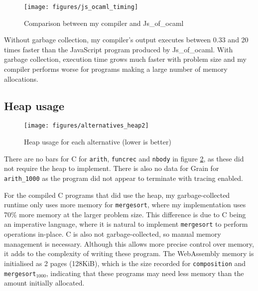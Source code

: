 \begin{figure}[H]
\hspace{-1.6cm}
\texttt{[image: figures/js\_ocaml\_timing]}
\vspace{-0.5cm}
\caption{Comparison between my compiler and Js\_of\_ocaml}
 \label{fig:js_oc_timing} 
\end{figure}

Without garbage collection, my compiler's output	executes between 0.33 and 20 times faster than the JavaScript program produced by  Js\_of\_ocaml. With garbage collection, execution time grows much faster with problem size and my compiler performs worse for programs making a large number of memory allocations.



\subsection{Heap usage}

\begin{figure}[H]
\hspace{-1cm}
\texttt{[image: figures/alternatives\_heap2]}
\vspace{-0.5cm}
\caption{Heap usage for each alternative (lower is better)}
 \label{fig:alt_heap} 
\end{figure}

There are no bars for C for \verb|arith|, \verb|funcrec| and \verb|nbody| in figure \ref{fig:alt_heap}, as these did not require the heap to implement. 
There is also no data for Grain for \verb|arith_1000| as the program did not appear to terminate with tracing enabled.

For the compiled C programs that did use the heap, my garbage-collected runtime only uses more memory for \verb|mergesort|, where my implementation uses 70\% more memory at the larger problem size. This difference is due to C being an imperative language, where it is natural to implement \verb|mergesort| to perform operations in-place. C is also not garbage-collected, so manual memory management is necessary. Although this allows more precise control over memory, it adds to the complexity of writing these program. %
The WebAssembly memory is initialised as 2 pages (128KiB), which is the size recorded for \verb|composition| and \verb|mergesort|$_{1000}$, indicating that these programs may need less memory than the amount initially allocated.


